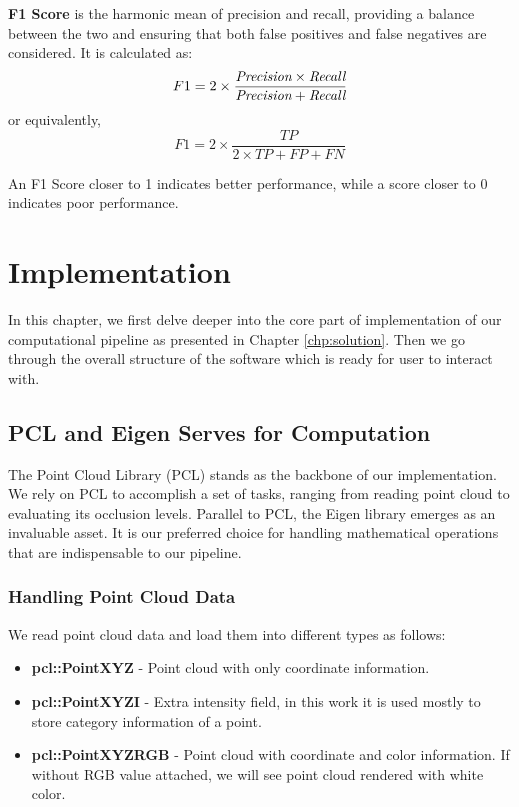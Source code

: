 \documentclass[11pt, a4paper,oneside,chapterprefix=false]{scrbook}
\begin{document}
\textbf{F1 Score} is the harmonic mean of precision and recall, providing a balance between the two and ensuring that both false positives and false negatives are considered. It is calculated as:
\[
    F1 = 2 \times \frac{\emph{Precision} \times \emph{Recall}}{\emph{Precision} + \emph{Recall}}
\]
or equivalently,
\[
    F1 = 2 \times \frac{TP}{2 \times TP + FP + FN}
\]

An F1 Score closer to 1 indicates better performance, while a score closer to 0 indicates poor performance.

\chapter{Implementation}\label{chp:implementation}

In this chapter, we first delve deeper into the core part of implementation of our computational pipeline as presented in Chapter \ref{chp:solution}. Then we go through the overall structure of the software which is ready for user to interact with.

\section{PCL and Eigen Serves for Computation}\label{sec:pcl and eigen}

The Point Cloud Library (PCL) stands as the backbone of our implementation. We rely on PCL to accomplish a set of tasks, ranging from reading point cloud to evaluating its occlusion levels. Parallel to PCL, the Eigen library emerges as an invaluable asset. It is our preferred choice for handling mathematical operations that are indispensable to our pipeline.

\subsection{Handling Point Cloud Data}

We read point cloud data and load them into different types as follows:

\begin{itemize}
    \item \textbf{pcl::PointXYZ} - Point cloud with only coordinate information.
    \item \textbf{pcl::PointXYZI} - Extra intensity field, in this work it is used mostly to store category information of a point.
    \item \textbf{pcl::PointXYZRGB} - Point cloud with coordinate and color information. If without RGB value attached, we will see point cloud rendered with white color.
\end{itemize}
\end{document}
